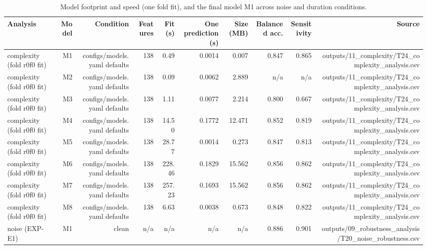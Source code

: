 \begin{table}[htbp]
  \centering
  \caption{Model footprint and speed (one fold fit), and the final model M1 across noise and duration conditions.}
  \label{tab:q1_t09}
  \begin{tabular}{lrrrrrrrrr}
    \toprule
    Analysis & Model & Condition & Features & Fit (s) & One prediction (s) & Size (MB) & Balanced acc. & Sensitivity & Source \\
    \midrule
    complexity (fold r0f0 fit) & M1 & configs/models.yaml defaults & 138 & 0.49 & 0.0014 & 0.007 & 0.847 & 0.865 & outputs/11\_complexity/T24\_complexity\_analysis.csv \\
    complexity (fold r0f0 fit) & M2 & configs/models.yaml defaults & 138 & 0.09 & 0.0062 & 2.889 & n/a & n/a & outputs/11\_complexity/T24\_complexity\_analysis.csv \\
    complexity (fold r0f0 fit) & M3 & configs/models.yaml defaults & 138 & 1.11 & 0.0077 & 2.214 & 0.800 & 0.667 & outputs/11\_complexity/T24\_complexity\_analysis.csv \\
    complexity (fold r0f0 fit) & M4 & configs/models.yaml defaults & 138 & 14.50 & 0.1772 & 12.471 & 0.852 & 0.819 & outputs/11\_complexity/T24\_complexity\_analysis.csv \\
    complexity (fold r0f0 fit) & M5 & configs/models.yaml defaults & 138 & 28.77 & 0.0014 & 0.273 & 0.847 & 0.813 & outputs/11\_complexity/T24\_complexity\_analysis.csv \\
    complexity (fold r0f0 fit) & M6 & configs/models.yaml defaults & 138 & 228.46 & 0.1829 & 15.562 & 0.856 & 0.862 & outputs/11\_complexity/T24\_complexity\_analysis.csv \\
    complexity (fold r0f0 fit) & M7 & configs/models.yaml defaults & 138 & 257.23 & 0.1693 & 15.562 & 0.856 & 0.862 & outputs/11\_complexity/T24\_complexity\_analysis.csv \\
    complexity (fold r0f0 fit) & M8 & configs/models.yaml defaults & 138 & 6.63 & 0.0038 & 0.673 & 0.848 & 0.822 & outputs/11\_complexity/T24\_complexity\_analysis.csv \\
    noise (EXP-E1) & M1 & clean & n/a & n/a & n/a & n/a & 0.886 & 0.901 & outputs/09\_robustness\_analysis/T20\_noise\_robustness.csv \\

\end{tabular}
\end{table}
